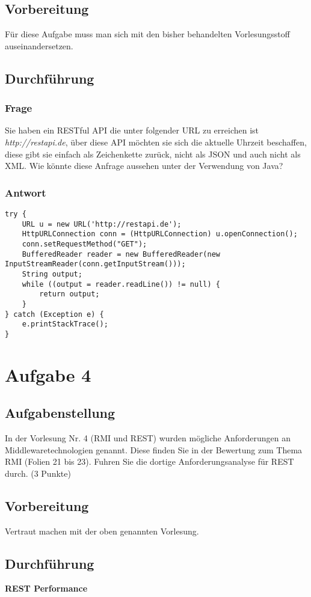 \subsection{Vorbereitung}
Für diese Aufgabe muss man sich mit den bisher behandelten Vorlesungsstoff auseinandersetzen. 

\subsection{Durchführung}

\subsubsection{Frage}
Sie haben ein RESTful API die unter folgender URL zu erreichen ist \textit{http://restapi.de}, über diese API möchten sie sich die aktuelle Uhrzeit beschaffen, diese gibt sie einfach als Zeichenkette zurück, nicht als JSON und auch nicht als XML. Wie könnte diese Anfrage aussehen unter der Verwendung von Java?

\subsubsection{Antwort}
\begin{lstlisting}
try {
	URL u = new URL('http://restapi.de');
	HttpURLConnection conn = (HttpURLConnection) u.openConnection();
	conn.setRequestMethod("GET");
	BufferedReader reader = new BufferedReader(new InputStreamReader(conn.getInputStream()));
	String output;
	while ((output = reader.readLine()) != null) {
		return output;
	}
} catch (Exception e) {
	e.printStackTrace();
}
\end{lstlisting}

\section{Aufgabe 4}

\subsection{Aufgabenstellung}
In der Vorlesung Nr. 4 (RMI und REST) wurden mögliche Anforderungen an Middlewaretechnologien
genannt. Diese finden Sie in der Bewertung zum Thema RMI (Folien 21
bis 23). Fuhren Sie die dortige Anforderungsanalyse für REST durch. (3 Punkte) 

\subsection{Vorbereitung}
Vertraut machen mit der oben genannten Vorlesung.

\subsection{Durchführung}
\textbf{REST Performance}

